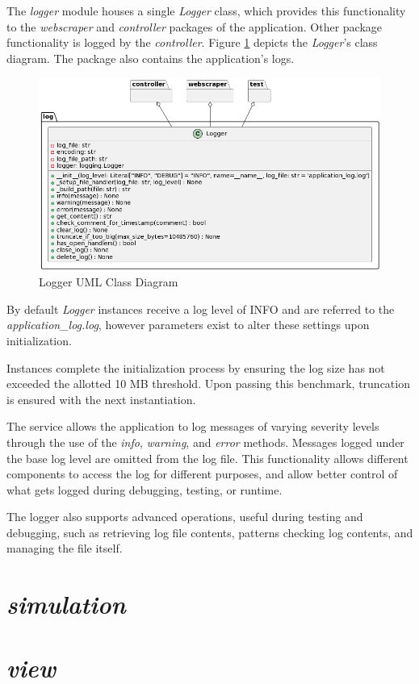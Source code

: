 \documentclass{thesis-ekf}
\theoremstyle{definition}
\theoremstyle{remark}
\begin{document}
The \emph{logger} module houses a single \emph{Logger} class, which provides this functionality to the \emph{webscraper} and \emph{controller} packages of the application. Other package functionality is logged by the \emph{controller}. Figure \ref{img-logger-class} depicts the \emph{Logger}'s class diagram. The package also contains the application's logs.

\begin{figure}[th!]
	\centering
	\includegraphics[width=0.7\linewidth]{img/class/logger}
	\caption{Logger UML Class Diagram}
	\label{img-logger-class}
\end{figure}

By default \emph{Logger} instances receive a log level of INFO and are referred to the \emph{application\_log.log}, however parameters exist to alter these settings upon initialization. 

Instances complete the initialization process by ensuring the log size has not exceeded the allotted 10 MB threshold. Upon passing this benchmark, truncation is ensured with the next instantiation.

The service allows the application to log messages of varying severity levels through the use of the \emph{info}, \emph{warning}, and \emph{error} methods. Messages logged under the base log level are omitted from the log file. This functionality allows different components to access the log for different purposes, and allow better control of what gets logged during debugging, testing, or runtime.

The logger also supports advanced operations, useful during testing and debugging, such as retrieving log file contents, patterns checking log contents, and managing the file itself.


\section{\emph{simulation}}
\section{\emph{view}}
\end{document}
